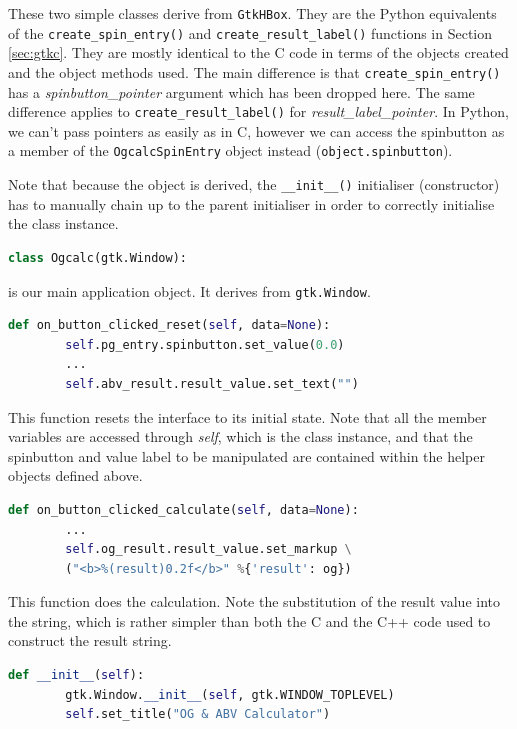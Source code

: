 \documentclass[a4paper,oneside]{article}
\newcommand{\variable}[1]{\textsl{#1}}
\newcommand{\class}[1]{\texttt{#1}}
\newcommand{\function}[1]{\texttt{#1()}}
\newcommand{\code}[1]{\texttt{#1}}
\begin{document}
These two simple classes derive from \class{GtkHBox}.  They are the
Python equivalents of the \function{create\_spin\_entry} and
\function{create\_result\_label} functions in Section \ref{sec:gtkc}.
They are mostly identical to the C code in terms of the objects
created and the object methods used.  The main difference is that
\function{create\_spin\_entry} has a \variable{spinbutton\_pointer}
argument which has been dropped here.  The same difference applies to
\function{create\_result\_label} for
\variable{result\_label\_pointer}.  In Python, we can't pass pointers
as easily as in C, however we can access the spinbutton as a member of
the \class{OgcalcSpinEntry} object instead (\code{object.spinbutton}).

Note that because the object is derived, the \function{\_\_init\_\_}
initialiser (constructor) has to manually chain up to the parent
initialiser in order to correctly initialise the class instance.

\begin{lstlisting}[numbers=none, language=Python]
class Ogcalc(gtk.Window):
\end{lstlisting}

\noindent is our main application object.  It derives from
\class{gtk.Window}.

\begin{lstlisting}[numbers=none, language=Python]
    def on_button_clicked_reset(self, data=None):
        self.pg_entry.spinbutton.set_value(0.0)
        ...
        self.abv_result.result_value.set_text("")
\end{lstlisting}

This function resets the interface to its initial state.  Note that
all the member variables are accessed through \variable{self}, which
is the class instance, and that the spinbutton and value label to be
manipulated are contained within the helper objects defined above.

\begin{lstlisting}[numbers=none, language=Python]
    def on_button_clicked_calculate(self, data=None):
        ...
        self.og_result.result_value.set_markup \
        ("<b>%(result)0.2f</b>" %{'result': og})
\end{lstlisting}

This function does the calculation.  Note the substitution of the
result value into the string, which is rather simpler than both the C
and the C++ code used to construct the result string.

\begin{lstlisting}[numbers=none, language=Python]
    def __init__(self):
        gtk.Window.__init__(self, gtk.WINDOW_TOPLEVEL)
        self.set_title("OG & ABV Calculator")
\end{lstlisting}
\end{document}
